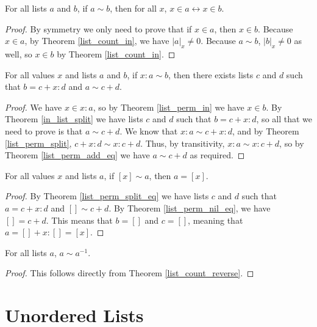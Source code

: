 \documentclass[../../math.tex]{subfiles}
\begin{document}
\begin{theorem} \label{list_perm_in}
    For all lists $a$ and $b$, if $a \sim b$, then for all $x$, $x \in a
    \leftrightarrow x \in b$.
\end{theorem}
\begin{proof}
    By symmetry we only need to prove that if $x \in a$, then $x \in b$.
    Because $x \in a$, by Theorem \ref{list_count_in}, we have $|a|_x \neq 0$.
    Because $a \sim b$, $|b|_x \neq 0$ as well, so $x \in b$ by Theorem
    \ref{list_count_in}.
\end{proof}

\begin{theorem} \label{list_perm_split_eq}
    For all values $x$ and lists $a$ and $b$, if $x : a \sim b$, then there
    exists lists $c$ and $d$ such that $b = c + x : d$ and $a \sim c + d$.
\end{theorem}
\begin{proof}
    We have $x \in x : a$, so by Theorem \ref{list_perm_in} we have $x \in b$.
    By Theorem \ref{in_list_split} we have lists $c$ and $d$ such that $b = c +
    x : d$, so all that we need to prove is that $a \sim c + d$.  We know that
    $x : a \sim c + x : d$, and by Theorem \ref{list_perm_split}, $c + x : d
    \sim x : c + d$.  Thus, by transitivity, $x : a \sim x : c + d$, so by
    Theorem \ref{list_perm_add_eq} we have $a \sim c + d$ as required.
\end{proof}

\begin{theorem} \label{list_perm_single}
    For all values $x$ and lists $a$, if $[x] \sim a$, then $a = [x]$.
\end{theorem}
\begin{proof}
    By Theorem \ref{list_perm_split_eq} we have lists $c$ and $d$ such that $a =
    c + x : d$ and $[] \sim c + d$.  By Theorem \ref{list_perm_nil_eq}, we have
    $[] = c + d$.  This means that $b = []$ and $c = []$,  meaning that $a = []
    + x : [] = [x]$.
\end{proof}

\begin{theorem} \label{list_perm_reverse}
    For all lists $a$, $a \sim a^{-1}$.
\end{theorem}
\begin{proof}
    This follows directly from Theorem \ref{list_count_reverse}.
\end{proof}

\section{Unordered Lists}
\end{document}
